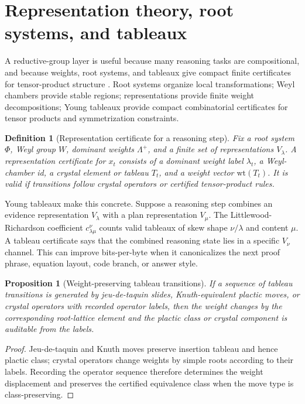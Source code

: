 \documentclass[10pt]{article}
\newtheorem{proposition}[theorem]{Proposition}
\newtheorem{definition}[theorem]{Definition}
\numberwithin{equation}{section}
\begin{document}
\section{Representation theory, root systems, and tableaux}
A reductive-group layer is useful because many reasoning tasks are compositional, and because weights, root systems, and tableaux give compact finite certificates for tensor-product structure \cite{fultonharris,macdonald,stanley}. Root systems organize local transformations; Weyl chambers provide stable regions; representations provide finite weight decompositions; Young tableaux provide compact combinatorial certificates for tensor products and symmetrization constraints.

\begin{definition}[Representation certificate for a reasoning step]
Fix a root system $\Phi$, Weyl group $W$, dominant weights $\Lambda^+$, and a finite set of representations $V_\lambda$. A representation certificate for $x_t$ consists of a dominant weight label $\lambda_t$, a Weyl-chamber id, a crystal element or tableau $T_t$, and a weight vector $\mathrm{wt}(T_t)$. It is valid if transitions follow crystal operators or certified tensor-product rules.
\end{definition}

Young tableaux make this concrete. Suppose a reasoning step combines an evidence representation $V_\lambda$ with a plan representation $V_\mu$. The Littlewood-Richardson coefficient $c^\nu_{\lambda\mu}$ counts valid tableaux of skew shape $\nu/\lambda$ and content $\mu$. A tableau certificate says that the combined reasoning state lies in a specific $V_\nu$ channel. This can improve bits-per-byte when it canonicalizes the next proof phrase, equation layout, code branch, or answer style.

\begin{proposition}[Weight-preserving tableau transitions]
If a sequence of tableau transitions is generated by jeu-de-taquin slides, Knuth-equivalent plactic moves, or crystal operators with recorded operator labels, then the weight changes by the corresponding root-lattice element and the plactic class or crystal component is auditable from the labels.
\end{proposition}
\begin{proof}
Jeu-de-taquin and Knuth moves preserve insertion tableau and hence plactic class; crystal operators change weights by simple roots according to their labels. Recording the operator sequence therefore determines the weight displacement and preserves the certified equivalence class when the move type is class-preserving.
\end{proof}
\end{document}

